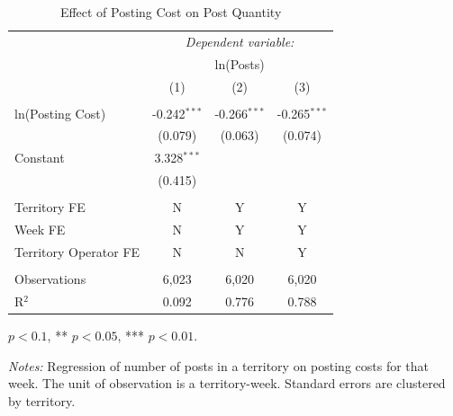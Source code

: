 \begin{table}[H]
\centering
\caption{Effect of Posting Cost on Post Quantity}
\vspace{0.2cm}
\label{tbl_posts_cost_reg}
\begin{threeparttable}
\begin{tabular}{lccc} 
\toprule
 & \multicolumn{3}{c}{\textit{Dependent variable:}} \\ 
 & \multicolumn{3}{c}{ln(Posts)} \\ [1ex]
 & (1) & (2) & (3)\\ 
\midrule
 &  &  &  \\
ln(Posting Cost)  & -0.242$^{***}$ & -0.266$^{***}$ & -0.265$^{***}$ \\
 & (0.079) & (0.063) & (0.074) \\ [1ex]
Constant  & 3.328$^{***}$ &  &  \\
 & (0.415) &  &  \\ [1ex]
& & & \\
Territory FE            & N & Y & Y \\
Week FE                 & N & Y & Y \\
Territory Operator FE   & N & N & Y \\
& & & \\
Observations  & 6,023 & 6,020 & 6,020 \\ 
R$^2$  & 0.092 & 0.776 & 0.788 \\ [1.8ex]
\bottomrule
\end{tabular} 
\begin{tablenotes}[flushleft]\footnotesize
\item[] \parbox[t]{\linewidth}{%
\hfill * $p<0.1$, ** $p<0.05$, *** $p<0.01$.
}
\item \textit{Notes:} Regression of number of posts in a territory on posting costs for that week. The unit of observation is a territory-week. Standard errors are clustered by territory.
\end{tablenotes}
\end{threeparttable}
\end{table}
